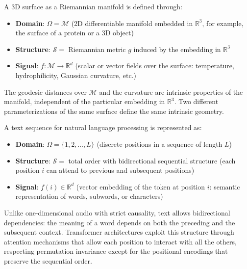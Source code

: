 \begin{example}\label{ex:superficie_riemanniana}
A 3D surface as a Riemannian manifold is defined through:
\begin{itemize}
	\item \textbf{Domain}: $\Omega = \mathcal{M}$ (2D differentiable manifold embedded in $\mathbb{R}^3$, for example, the surface of a protein or a 3D object)
	\item \textbf{Structure}: $\mathcal{S} = $ Riemannian metric $g$ induced by the embedding in $\mathbb{R}^3$
	\item \textbf{Signal}: $f: \mathcal{M} \to \mathbb{R}^d$ (scalar or vector fields over the surface: temperature, hydrophilicity, Gaussian curvature, etc.)
\end{itemize}

The geodesic distances over $\mathcal{M}$ and the curvature are intrinsic properties of the manifold, independent of the particular embedding in $\mathbb{R}^3$. Two different parameterizations of the same surface define the same intrinsic geometry.
\end{example}

\begin{example}\label{ex:secuencia_texto}
A text sequence for natural language processing is represented as:
\begin{itemize}
	\item \textbf{Domain}: $\Omega = \{1, 2, \ldots, L\}$ (discrete positions in a sequence of length $L$)
	\item \textbf{Structure}: $\mathcal{S} = $ total order with bidirectional sequential structure (each position $i$ can attend to previous and subsequent positions)
	\item \textbf{Signal}: $f(i) \in \mathbb{R}^d$ (vector embedding of the token at position $i$: semantic representation of words, subwords, or characters)
\end{itemize}

Unlike one-dimensional audio with strict causality, text allows bidirectional dependencies: the meaning of a word depends on both the preceding and the subsequent context. \gls{Transformer} architectures exploit this structure through attention mechanisms that allow each position to interact with all the others, respecting permutation invariance except for the positional encodings that preserve the sequential order.
\end{example}

